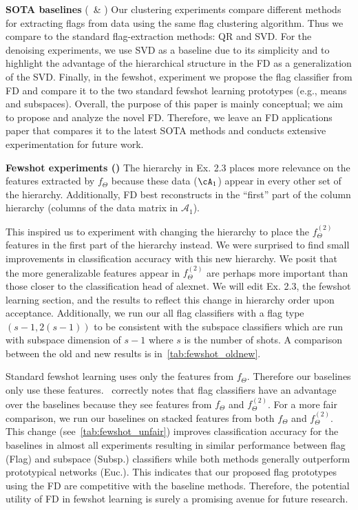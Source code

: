\documentclass[10pt,twocolumn,letterpaper]{article}
\begin{document}
\noindent \textbf{SOTA baselines} (\Rone~\& \Rfour) Our clustering experiments compare different methods for extracting flags from data using the same flag clustering algorithm. Thus we compare to the standard flag-extraction methods: QR and SVD. For the denoising experiments, we use SVD as a baseline due to its simplicity and to highlight the advantage of the hierarchical structure in the FD as a generalization of the SVD. Finally, in the fewshot, experiment we propose the flag classifier from FD and compare it to the two standard fewshot learning prototypes (e.g., means and subspaces). Overall, the purpose of this paper is mainly conceptual; we aim to propose and analyze the novel FD. Therefore, we leave an FD applications paper that compares it to the latest SOTA methods and conducts extensive experimentation for future work.  

\noindent \textbf{Fewshot experiments (\Rtwo)}
The hierarchy in Ex. 2.3 places more relevance on the features extracted by $f_{\Theta}$ because these data ($\cA_1$) appear in every other set of the hierarchy. Additionally, FD best reconstructs in the ``first'' part of the column hierarchy (columns of the data matrix in $\mathcal{A}_1$). 

This inspired us to experiment with changing the hierarchy to place the $f^{(2)}_{\Theta}$ features in the first part of the hierarchy instead. We were surprised to find small improvements in classification accuracy with this new hierarchy. We posit that the more generalizable features appear in $f_{\Theta}^{(2)}$ are perhaps more important than those closer to the classification head of alexnet. We will edit Ex. 2.3, the fewshot learning section, and the results to reflect this change in hierarchy order upon acceptance. Additionally, we run our all flag classifiers with a flag type $(s-1, 2(s-1))$ to be consistent with the subspace classifiers which are run with subspace dimension of $s-1$ where $s$ is the number of shots. A comparison between the old and new results is in~\cref{tab:fewshot_oldnew}.



Standard fewshot learning uses only the features from $f_{\Theta}$. Therefore our baselines only use these features. \Rtwo~correctly notes that flag classifiers have an advantage over the baselines because they see features from $f_{\Theta}$ and $f_{\Theta}^{(2)}$. For a more fair comparison, we run our baselines on stacked features from both $f_{\Theta}$ and $f_{\Theta}^{(2)}$. This change (see~\cref{tab:fewshot_unfair}) improves classification accuracy for the baselines in almost all experiments resulting in similar performance between flag (Flag) and subspace (Subsp.) classifiers while both methods generally outperform prototypical networks (Euc.). This indicates that our proposed flag prototypes using the FD are competitive with the baseline methods. Therefore, the potential utility of FD in fewshot learning is surely a promising avenue for future research.
\end{document}
